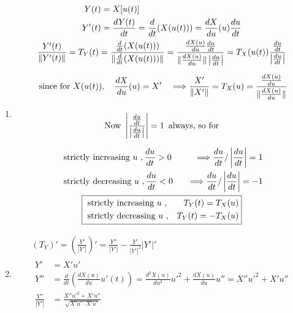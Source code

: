 \documentclass[twoside]{amsart}
\theoremstyle{plain}
\theoremstyle{definition}
\newcommand{\exercisehead}[1]
  {\smallskip
   \noindent{\small\bf Exercise #1.}}
\begin{document}
\exercisehead{16}\begin{enumerate}
\item \[
\begin{gathered}
  \begin{aligned} 
    Y(t) & = X[u(t)] \\
    Y'(t) & = \frac{dY(t)}{dt} = \frac{d}{dt} (X(u(t))) = \frac{dX}{du}(u) \frac{du}{dt}
  \end{aligned} \\
  \frac{ Y'(t)}{ \| Y'(t) \| } = T_Y(t) = \frac{ \frac{d}{dt} (X(u(t))) }{ \| \frac{d}{dt} (X(u(t))) \| } = \frac{ \frac{dX(u)}{du} \frac{du}{dt} }{ \| \frac{dX(u)}{du} \| \left| \frac{du}{dt} \right| } = T_X(u(t)) \frac{ \frac{du}{dt} }{ \left| \frac{du}{dt} \right| } \medskip \\
  \text{ since for } X(u(t)), \quad \frac{dX}{du}(u) = X' \quad \Longrightarrow
  \frac{X'}{\| X' \| } = T_X(u) = \frac{ \frac{dX(u)}{du} }{ \| \frac{dX(u)}{du} \| } \bigskip \\
  \text{ Now } \left| \frac{ \frac{du}{dt} }{ \left| \frac{du}{dt} \right| } \right| = 1 \, \text{ always, so for } \medskip \\
  \begin{aligned}
    & \text{ strictly increasing $u$ }, \frac{du}{dt} > 0 \quad & \Longrightarrow \frac{du}{dt} / \left| \frac{du}{dt} \right| = 1 \\
    & \text{ strictly decreasing $u$ }, \frac{du}{dt} < 0 \quad & \Longrightarrow \frac{du}{dt} / \left| \frac{du}{dt} \right| =- 1 
  \end{aligned} \\
\boxed{  \begin{aligned}
    & \text{ strictly increasing $u$ }, & T_Y(t) = T_X(u) \\
    & \text{ strictly decreasing $u$ }, & T_Y(t) = - T_X(u)
  \end{aligned} }
\end{gathered}
\]
\item \[
\begin{gathered}
  (T_Y)' = \left( \frac{Y'}{ |Y'|} \right)' = \frac{Y''}{|Y'|} - \frac{Y'}{|Y'|^2} |Y'|' \\ 
  \begin{aligned}
    Y' & = X'u' \\
    Y'' & = \frac{d}{dt} \left( \frac{dX(u)}{du} u'(t) \right) = \frac{d^2 X(u)}{du^2} u'^2 + \frac{dX(u)}{du}u'' = X''u'^2 + X' u'' \\
    \frac{Y''}{|Y'|} & = \frac{ X'' u'^2 + X' u'' }{ \sqrt{ X' u' \cdot X'u' }} \\

\end{aligned}
\end{gathered}\]
\end{enumerate}
\end{document}
